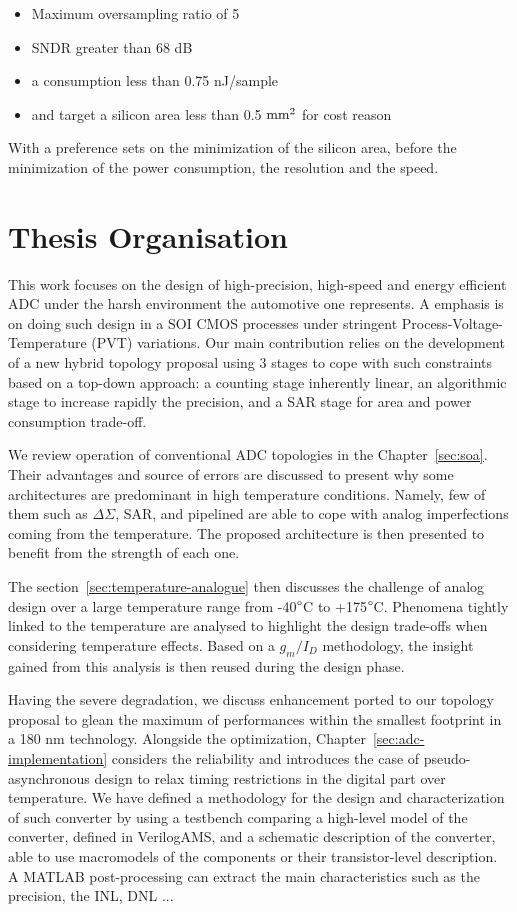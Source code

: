 \begin{itemize}
	\item Maximum oversampling ratio of 5
	\item SNDR greater than 68 dB
	\item a consumption less than 0.75 nJ/sample
	\item and target a silicon area less than 0.5 \(\rm mm^2 \) for cost reason
\end{itemize}
 
With a preference sets on the minimization of the silicon area, before the minimization of the power consumption, the resolution and the speed.

\section{Thesis Organisation}

This work focuses on the design of high-precision, high-speed and energy efficient ADC under the harsh environment the automotive one represents. A emphasis is on doing such design in a SOI CMOS processes under stringent Process-Voltage-Temperature (PVT) variations. Our main contribution relies on the development of a new hybrid topology proposal using 3 stages to cope with such constraints based on a top-down approach: a counting stage inherently linear, an algorithmic stage to increase rapidly the precision, and a SAR stage for area and power consumption trade-off.

We review operation of conventional ADC topologies in the Chapter~\ref{sec:soa}. Their advantages and source of errors are discussed to present why some architectures are predominant in high temperature conditions. Namely, few of them such as \(\Delta \Sigma\), SAR, and pipelined are able to cope with analog imperfections coming from the temperature. The proposed architecture is then presented to benefit from the strength of each one.

The section~\ref{sec:temperature-analogue} then discusses the challenge of analog design over a large temperature range from -40\(\degree\)C to +175\(\degree\)C. Phenomena tightly linked to the temperature are analysed to highlight the design trade-offs when considering temperature effects. Based on a \(g_m/I_D\) methodology, the insight gained from this analysis is then reused during the design phase.

Having the severe degradation, we discuss enhancement ported to our topology proposal to glean the maximum of performances within the smallest footprint in a 180 nm technology. Alongside the optimization, Chapter~\ref{sec:adc-implementation} considers the reliability and introduces the case of pseudo-asynchronous design to relax timing restrictions in the digital part over temperature. We have defined a methodology for the design and characterization of such converter by using a testbench comparing a high-level model of the converter, defined in VerilogAMS, and a schematic description of the converter, able to use macromodels of the components or their transistor-level description. A MATLAB post-processing can extract the main characteristics such as the precision, the INL, DNL ...

